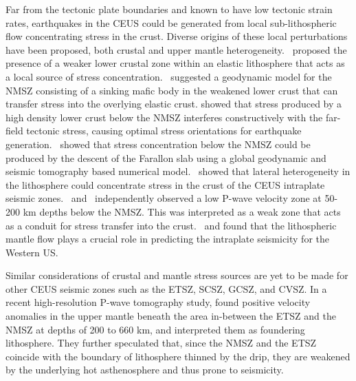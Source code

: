 \documentclass[draft,linenumbers]{agujournal2018}
\begin{document}
    Far from the tectonic plate boundaries and known to have low tectonic strain rates, earthquakes in the CEUS could be generated from local sub-lithospheric flow concentrating stress in the crust. Diverse origins of these local perturbations have been proposed, both crustal and upper mantle heterogeneity.~\citet{Kenner_2000a} proposed the presence of a weaker lower crustal zone within an elastic lithosphere that acts as a local source of stress concentration.~\citet{Pollitz_2001} suggested a geodynamic model for the NMSZ consisting of a sinking mafic body in the weakened lower crust that can transfer stress into the overlying elastic crust. \citet{levandowski2016dense} showed that stress produced by a high density lower crust below the NMSZ interferes constructively with the far-field tectonic stress, causing optimal stress orientations for earthquake generation.~\citet{forte2007descent} showed that stress concentration below the NMSZ could be produced by the descent of the Farallon slab using a global geodynamic and seismic tomography based numerical model.~\citet{li2007stress} showed that lateral heterogeneity in the lithosphere could concentrate stress in the crust of the CEUS intraplate seismic zones.~\citet{chen2014crust} and~\citet{nyamwandha2016joint} independently observed a low P-wave velocity zone at 50-200 km depths below the NMSZ. This was interpreted as a weak zone that acts as a conduit for stress transfer into the crust.~\citet{becker2015western} and found that the lithospheric mantle flow  plays a crucial role in predicting the intraplate seismicity for the Western US.  
    
Similar considerations of crustal and mantle stress sources are yet to be made for other CEUS seismic zones such as the ETSZ, SCSZ, GCSZ, and CVSZ. In a recent high-resolution P-wave tomography study, \citet{Biryol_2016} found positive velocity anomalies in the upper mantle beneath the area in-between the ETSZ and the NMSZ at depths of 200 to 660 km, and interpreted them as foundering lithosphere. They further speculated that, since the NMSZ and the ETSZ coincide with the boundary of lithosphere thinned by the drip, they are weakened by the underlying hot asthenosphere and thus prone to seismicity. 
\end{document}
